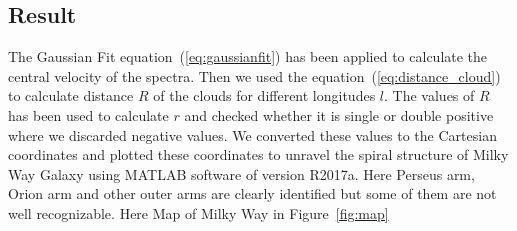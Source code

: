 \documentclass[conference]{IEEEtran}
\begin{document}
\subsection{Result}

The Gaussian Fit equation~(\ref{eq:gaussianfit}) has been applied to calculate the central velocity of the spectra. Then we used the equation~(\ref{eq:distance_cloud}) to calculate distance $\mathit{R}$ of the clouds for different longitudes $\mathit{l}$. The values of $\mathit{R}$ has been used to calculate $\mathit{r}$ and checked whether it is single or double positive where we discarded negative values\cite{ThomasBensby2017,santo2013mapping}. We converted these values to the Cartesian coordinates and plotted these coordinates to unravel the spiral structure of Milky Way Galaxy using MATLAB software of version R2017a. Here Perseus arm, Orion arm and other outer arms are clearly identified but some of them are not well recognizable. Here Map of Milky Way in Figure~\ref{fig:map}
\end{document}
